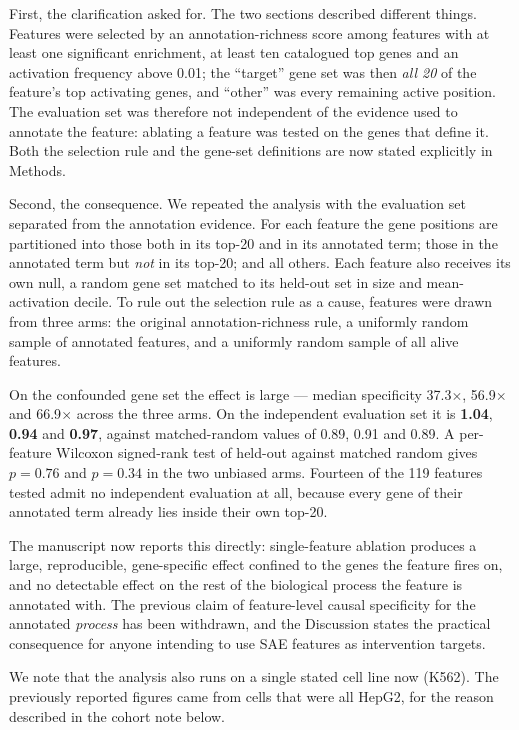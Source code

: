 \documentclass[11pt]{article}
\begin{document}
First, the clarification asked for. The two sections described different things. Features were
selected by an annotation-richness score among features with at least one significant enrichment,
at least ten catalogued top genes and an activation frequency above 0.01; the ``target'' gene set
was then \emph{all 20} of the feature's top activating genes, and ``other'' was every remaining
active position. The evaluation set was therefore not independent of the evidence used to annotate
the feature: ablating a feature was tested on the genes that define it. Both the selection rule and
the gene-set definitions are now stated explicitly in Methods.

Second, the consequence. We repeated the analysis with the evaluation set separated from the
annotation evidence. For each feature the gene positions are partitioned into those both in its
top-20 and in its annotated term; those in the annotated term but \emph{not} in its top-20; and all
others. Each feature also receives its own null, a random gene set matched to its held-out set in
size and mean-activation decile. To rule out the selection rule as a cause, features were drawn from
three arms: the original annotation-richness rule, a uniformly random sample of annotated features,
and a uniformly random sample of all alive features.

On the confounded gene set the effect is large --- median specificity 37.3$\times$, 56.9$\times$
and 66.9$\times$ across the three arms. On the independent evaluation set it is
\textbf{1.04}, \textbf{0.94} and \textbf{0.97}, against matched-random values of 0.89, 0.91 and
0.89. A per-feature Wilcoxon signed-rank test of held-out against matched random gives $p = 0.76$
and $p = 0.34$ in the two unbiased arms. Fourteen of the 119 features tested admit no independent
evaluation at all, because every gene of their annotated term already lies inside their own top-20.

The manuscript now reports this directly: single-feature ablation produces a large, reproducible,
gene-specific effect confined to the genes the feature fires on, and no detectable effect on the
rest of the biological process the feature is annotated with. The previous claim of feature-level
causal specificity for the annotated \emph{process} has been withdrawn, and the Discussion states
the practical consequence for anyone intending to use SAE features as intervention targets.

We note that the analysis also runs on a single stated cell line now (K562). The previously reported
figures came from cells that were all HepG2, for the reason described in the cohort note below.
\end{document}
